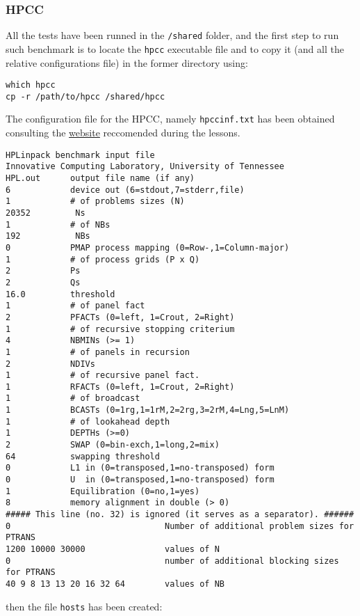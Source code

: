 \subsubsection{HPCC}
All the tests have been runned in the \texttt{/shared} folder, and the first step to run such benchmark is to locate the \texttt{hpcc} executable file and to copy it (and all the relative configurations file) in the former directory using:

\begin{verbatim}
which hpcc
cp -r /path/to/hpcc /shared/hpcc
\end{verbatim}

The configuration file for the HPCC, namely \texttt{hpccinf.txt} has been obtained consulting the \href{https://www.advancedclustering.com/act_kb/tune-hpl-dat-file/}{website} reccomended during the lessons.

\begin{verbatim}
HPLinpack benchmark input file
Innovative Computing Laboratory, University of Tennessee
HPL.out      output file name (if any) 
6            device out (6=stdout,7=stderr,file)
1            # of problems sizes (N)
20352         Ns
1            # of NBs
192           NBs
0            PMAP process mapping (0=Row-,1=Column-major)
1            # of process grids (P x Q)
2            Ps
2            Qs
16.0         threshold
1            # of panel fact
2            PFACTs (0=left, 1=Crout, 2=Right)
1            # of recursive stopping criterium
4            NBMINs (>= 1)
1            # of panels in recursion
2            NDIVs
1            # of recursive panel fact.
1            RFACTs (0=left, 1=Crout, 2=Right)
1            # of broadcast
1            BCASTs (0=1rg,1=1rM,2=2rg,3=2rM,4=Lng,5=LnM)
1            # of lookahead depth
1            DEPTHs (>=0)
2            SWAP (0=bin-exch,1=long,2=mix)
64           swapping threshold
0            L1 in (0=transposed,1=no-transposed) form
0            U  in (0=transposed,1=no-transposed) form
1            Equilibration (0=no,1=yes)
8            memory alignment in double (> 0)
##### This line (no. 32) is ignored (it serves as a separator). ######
0                               Number of additional problem sizes for PTRANS
1200 10000 30000                values of N
0                               number of additional blocking sizes for PTRANS
40 9 8 13 13 20 16 32 64        values of NB
\end{verbatim}

then the file \texttt{hosts} has been created:

